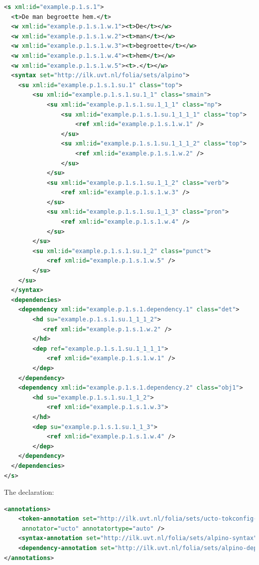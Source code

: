 \documentclass[a4paper,12pt]{report}
\begin{document}
\begin{lstlisting}[language=xml]
<s xml:id="example.p.1.s.1">
  <t>De man begroette hem.</t>
  <w xml:id="example.p.1.s.1.w.1"><t>De</t></w>
  <w xml:id="example.p.1.s.1.w.2"><t>man</t></w>
  <w xml:id="example.p.1.s.1.w.3"><t>begroette</t></w>
  <w xml:id="example.p.1.s.1.w.4"><t>hem</t></w>
  <w xml:id="example.p.1.s.1.w.5"><t>.</t></w>
  <syntax set="http://ilk.uvt.nl/folia/sets/alpino">
    <su xml:id="example.p.1.s.1.su.1" class="top">     
        <su xml:id="example.p.1.s.1.su.1_1" class="smain">     
            <su xml:id="example.p.1.s.1.su.1_1_1" class="np">     
                <su xml:id="example.p.1.s.1.su.1_1_1_1" class="top">     
                    <ref xml:id="example.p.1.s.1.w.1" />       
                </su>
                <su xml:id="example.p.1.s.1.su.1_1_1_2" class="top">     
                    <ref xml:id="example.p.1.s.1.w.2" />
                </su> 
            </su>
            <su xml:id="example.p.1.s.1.su.1_1_2" class="verb">     
                <ref xml:id="example.p.1.s.1.w.3" />   
            </su>
            <su xml:id="example.p.1.s.1.su.1_1_3" class="pron">     
                <ref xml:id="example.p.1.s.1.w.4" />   
            </su>
        </su>
        <su xml:id="example.p.1.s.1.su.1_2" class="punct">
            <ref xml:id="example.p.1.s.1.w.5" />               
        </su> 
    </su>
  </syntax>
  <dependencies>
    <dependency xml:id="example.p.1.s.1.dependency.1" class="det">
        <hd su="example.p.1.s.1.su.1_1_1_2">
           <ref xml:id="example.p.1.s.1.w.2" />   
        </hd>
        <dep ref="example.p.1.s.1.su.1_1_1_1">
            <ref xml:id="example.p.1.s.1.w.1" />   
        </dep>
    </dependency>
    <dependency xml:id="example.p.1.s.1.dependency.2" class="obj1">
        <hd su="example.p.1.s.1.su.1_1_2">
            <ref xml:id="example.p.1.s.1.w.3">
        </hd>
        <dep su="example.p.1.s.1.su.1_1_3">
            <ref xml:id="example.p.1.s.1.w.4" />   
        </dep>
    </dependency>
  </dependencies>
</s>
\end{lstlisting}

The declaration:

\begin{lstlisting}[language=xml]
<annotations>
    <token-annotation set="http://ilk.uvt.nl/folia/sets/ucto-tokconfig-nl" 
     annotator="ucto" annotatortype="auto" />
    <syntax-annotation set="http://ilk.uvt.nl/folia/sets/alpino-syntax" /> 
    <dependency-annotation set="http://ilk.uvt.nl/folia/sets/alpino-dep" />
</annotations>
\end{lstlisting}
\end{document}
